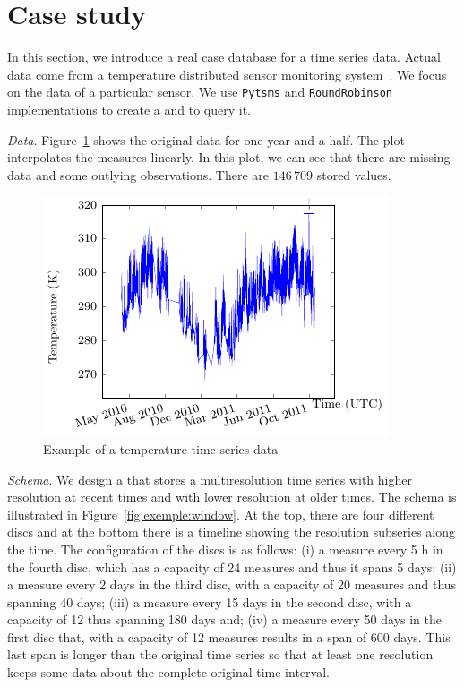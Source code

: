 
\section{Case study}
\label{sec:example}

In this section, we introduce a real case database for a time series
data. Actual data come from a temperature distributed sensor
monitoring system~\cite{alippi10}. We focus on the data of a
particular sensor. We use \texttt{Pytsms} and \texttt{RoundRobinson}
implementations to create a  and to query it.

\emph{Data}. Figure~\ref{fig:exemple:original} shows the original data
for one year and a half. The plot interpolates the measures
linearly. In this plot, we can see that there are missing data and
some outlying observations. There are $146\,709$ stored values.

\begin{figure}[tp]
  \centering
  \includegraphics{fig_exemple_original.pdf}
  \caption{Example of a temperature time series data}
  \label{fig:exemple:original}
\end{figure}

\emph{Schema}. We design a  that stores a multiresolution
time series with higher resolution at recent times and with lower
resolution at older times. The schema is illustrated in
Figure~\ref{fig:exemple:window}. At the top, there are four different
discs and at the bottom there is a timeline showing the resolution
subseries along the time. The configuration of the discs is as
follows: (i) a measure every 5 h in the fourth disc, which has a
capacity of 24 measures and thus it spans 5 days; (ii) a measure every
2 days in the third disc, with a capacity of 20 measures and thus
spanning 40 days; (iii) a measure every 15 days in the second disc,
with a capacity of 12 thus spanning 180 days and; (iv) a measure every
50 days in the first disc that, with a capacity of 12 measures results
in a span of 600 days. This last span is longer than the original time
series so that at least one resolution keeps some data about the
complete original time interval.

